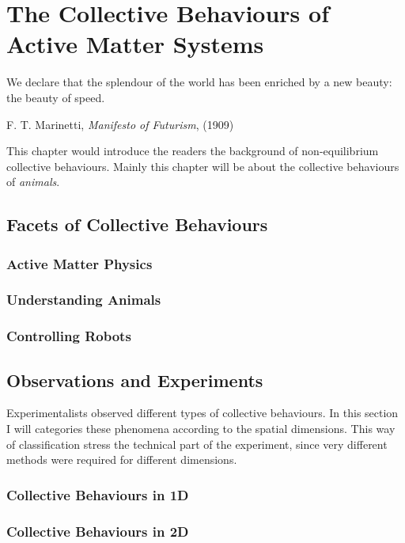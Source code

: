 \documentclass[11pt,twoside]{report}
\begin{document}
\chapter{The Collective Behaviours of Active Matter Systems}

\label{chapter:collective_behaviour}

\epigraph{We declare that the splendour of the world has been enriched by a new beauty: the beauty of speed.}{F. T. Marinetti, \emph{Manifesto of Futurism}, (1909)}

This chapter would introduce the readers the background of non-equilibrium collective behaviours. Mainly this chapter will be about the collective behaviours of \emph{animals}.

\section{Facets of Collective Behaviours}

\subsection{Active Matter Physics}

\subsection{Understanding Animals}

\subsection{Controlling Robots}


\section{Observations and Experiments}

Experimentalists observed different types of collective behaviours. In this section I will categories these phenomena according to the spatial dimensions. This way of classification stress the technical part of the experiment, since very different methods were required for different dimensions.

\subsection{Collective Behaviours in 1D}

\subsection{Collective Behaviours in 2D}
\end{document}
